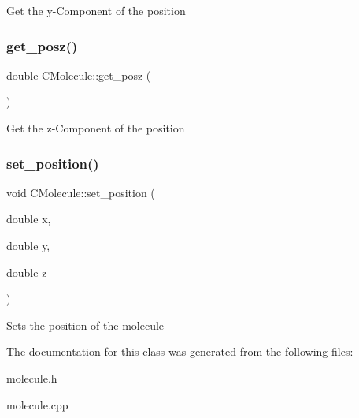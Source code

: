 Get the y-\/\+Component of the position \mbox{\label{classCMolecule_a69483e3d6820a96f004ba6c78f8d166e}} 
\subsubsection{\texorpdfstring{get\+\_\+posz()}{get\_posz()}}
{\footnotesize\ttfamily double C\+Molecule\+::get\+\_\+posz (\begin{DoxyParamCaption}{ }\end{DoxyParamCaption})}

Get the z-\/\+Component of the position \mbox{\label{classCMolecule_ad9a66ae676bd9ed1012f0c6e952369e0}} 
\subsubsection{\texorpdfstring{set\+\_\+position()}{set\_position()}}
{\footnotesize\ttfamily void C\+Molecule\+::set\+\_\+position (\begin{DoxyParamCaption}\item[{double}]{x,  }\item[{double}]{y,  }\item[{double}]{z }\end{DoxyParamCaption})}

Sets the position of the molecule 

The documentation for this class was generated from the following files\+:\begin{DoxyCompactItemize}
\item 
molecule.\+h\item 
molecule.\+cpp\end{DoxyCompactItemize}

